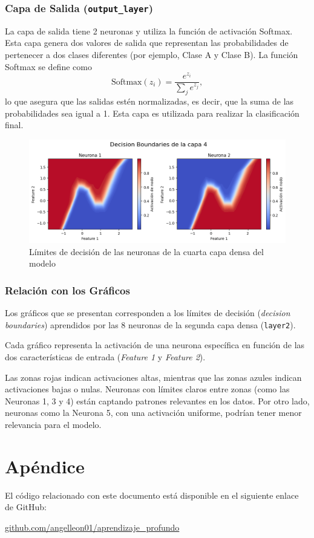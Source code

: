 \documentclass[paper=a4, fontsize=11pt]{scrartcl} %
\numberwithin{equation}{section} %
\numberwithin{figure}{section} %
\numberwithin{table}{section} %
\begin{document}
\subsubsection{Capa de Salida (\texttt{output\_layer})}
La capa de salida tiene 2 neuronas y utiliza la función de activación Softmax. Esta capa genera dos valores de salida que representan las probabilidades de pertenecer a dos clases diferentes (por ejemplo, Clase A y Clase B). La función Softmax se define como
\[
\text{Softmax}(z_i) = \frac{e^{z_i}}{\sum_{j} e^{z_j}},
\]
lo que asegura que las salidas estén normalizadas, es decir, que la suma de las probabilidades sea igual a 1. Esta capa es utilizada para realizar la clasificación final.


\begin{figure}[H]
  \centering
  \includegraphics[width=1\linewidth]{images/plot_neuronas_L4.png}
  \caption{Límites de decisión de las neuronas de la cuarta capa densa del modelo}
  \label{fig:sub1}
\end{figure}

\subsubsection{Relación con los Gráficos}
Los gráficos que se presentan corresponden a los límites de decisión (\textit{decision boundaries}) aprendidos por las 8 neuronas de la segunda capa densa (\texttt{layer2}).

Cada gráfico representa la activación de una neurona específica en función de las dos características de entrada (\textit{Feature 1} y \textit{Feature 2}). 

Las zonas rojas indican activaciones altas, mientras que las zonas azules indican activaciones bajas o nulas. Neuronas con límites claros entre zonas (como las Neuronas 1, 3 y 4) están captando patrones relevantes en los datos. Por otro lado, neuronas como la Neurona 5, con una activación uniforme, podrían tener menor relevancia para el modelo.

\newpage
\appendix
\section*{Apéndice}
El código relacionado con este documento está disponible en el siguiente enlace de GitHub:
\begin{center}
    \href{https://github.com/angelleon01/aprendizaje_profundo}{github.com/angelleon01/aprendizaje\_profundo}
\end{center}
\end{document}
